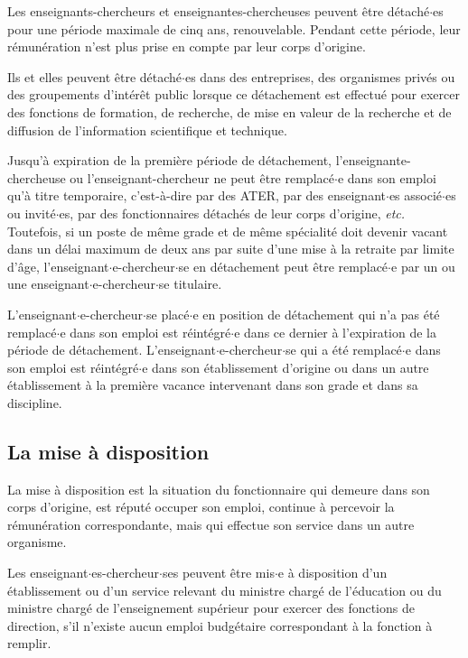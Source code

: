 Les enseignants-chercheurs et enseignantes-chercheuses peuvent \^etre d\'etach\'e$\cdot$es pour une
p\'eriode maximale de cinq ans, renouvelable.
Pendant cette p\'eriode, leur r\'emun\'eration n'est plus prise en compte par
leur corps d'origine.

Ils et elles peuvent \^etre d\'etach\'e$\cdot$es dans des entreprises, des organismes
priv\'es ou des groupements d'int\'er\^et public lorsque ce
d\'etachement est effectu\'e pour exercer des fonctions de
formation, de recherche, de mise en valeur de la recherche et de
diffusion de l'information scientifique et technique.

Jusqu'\`a expiration de la premi\`ere p\'eriode de d\'etachement,
l'enseignante-chercheuse ou l'enseignant-chercheur ne peut \^etre remplac\'e$\cdot$e dans son emploi
qu'\`a titre temporaire, c'est-\`a-dire par des ATER, par des
enseignant$\cdot$es associ\'e$\cdot$es ou invit\'e$\cdot$es, par des fonctionnaires
d\'etach\'es de leur corps d'origine, {\em etc.} Toutefois, si un
poste de m\^eme grade et de m\^eme sp\'ecialit\'e doit devenir
vacant dans un d\'elai maximum de deux ans par suite d'une mise \`a
la retraite par limite d'\^age, l'enseignant$\cdot$e-chercheur$\cdot$se en
d\'etachement peut \^etre remplac\'e$\cdot$e par un ou une enseignant$\cdot$e-chercheur$\cdot$se
titulaire.

L'enseignant$\cdot$e-chercheur$\cdot$se plac\'e$\cdot$e en position de d\'etachement qui n'a pas
\'et\'e remplac\'e$\cdot$e dans son emploi est r\'eint\'egr\'e$\cdot$e dans ce dernier
\`a l'expiration de la p\'eriode de d\'etachement.
L'enseignant$\cdot$e-chercheur$\cdot$se qui a \'et\'e remplac\'e$\cdot$e dans son emploi est
r\'eint\'egr\'e$\cdot$e dans son \'etablissement d'origine ou dans un autre
\'etablissement \`a la premi\`ere vacance intervenant dans son grade et
dans sa discipline.

\subsection*{La mise \`a disposition}

La mise \`a disposition est la situation du fonctionnaire qui demeure
dans son corps d'origine, est r\'eput\'e occuper son emploi, continue
\`a percevoir la r\'emun\'eration correspondante, mais qui effectue son
service dans un autre organisme.

Les enseignant$\cdot$es-chercheur$\cdot$ses peuvent \^etre mis$\cdot$e \`a disposition d'un
\'etablissement ou d'un service relevant du ministre charg\'e de
l'\'education ou du ministre charg\'e de l'enseignement sup\'erieur
pour exercer des fonctions de direction, s'il n'existe aucun emploi
budg\'etaire correspondant \`a la fonction \`a remplir.

